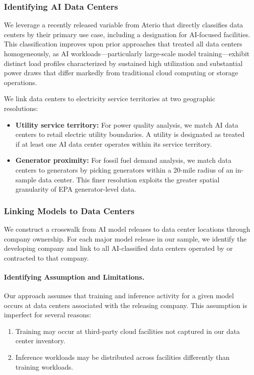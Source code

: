 \documentclass[a4paper,fleqn,longmktitle]{cas-sc}
\begin{document}
\subsubsection{Identifying AI Data Centers}

We leverage a recently released variable from Aterio that directly classifies data centers by their primary use case, including a designation for AI-focused facilities. This classification improves upon prior approaches that treated all data centers homogeneously, as AI workloads---particularly large-scale model training---exhibit distinct load profiles characterized by sustained high utilization and substantial power draws that differ markedly from traditional cloud computing or storage operations.

We link data centers to electricity service territories at two geographic resolutions:
\begin{itemize}
    \item \textbf{Utility service territory:} For power quality analysis, we match AI data centers to retail electric utility boundaries. A utility is designated as treated if at least one AI data center operates within its service territory.
    \item \textbf{Generator proximity:} For fossil fuel demand analysis, we match data centers to generators by picking generators within a 20-mile radius of an in-sample data center. This finer resolution exploits the greater spatial granularity of EPA generator-level data.
\end{itemize}

\subsubsection{Linking Models to Data Centers}

We construct a crosswalk from AI model releases to data center locations through company ownership. For each major model release in our sample, we identify the developing company and link to all AI-classified data centers operated by or contracted to that company. 

\paragraph{Identifying Assumption and Limitations.} Our approach assumes that training and inference activity for a given model occurs at data centers associated with the releasing company. This assumption is imperfect for several reasons:
\begin{enumerate}
    \item Training may occur at third-party cloud facilities not captured in our data center inventory.
    \item Inference workloads may be distributed across facilities differently than training workloads.
\end{enumerate}
\end{document}
